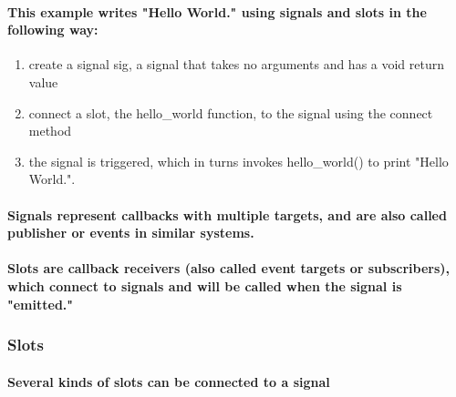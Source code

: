 \documentclass[9pt,onside,a4paper]{article}
\newcommand{\hlkwd}[1]{\textcolor[rgb]{0.82,0.11,0.93}{#1}}
\begin{document}
\paragraph{This example writes "Hello World." using signals and slots in the following way:}
\begin{enumerate}
\item create a signal \hlkwd{sig}, a signal that takes no arguments and has a void return value 
\item connect a slot, the \hlkwd{hello\_world} function, to the signal using the \hlkwd{connect} method
\item the signal is triggered, which in turns invokes \hlkwd{hello\_world()} to print "Hello World.".
\end{enumerate}
\paragraph{Signals represent callbacks with multiple targets, and are also called publisher or events in similar systems.}
\paragraph{Slots are callback receivers (also called event targets or subscribers), which connect to signals and will be called when the signal is "emitted."}

\subsubsection{Slots}

\paragraph{Several kinds of slots can be connected to a signal}
\end{document}
